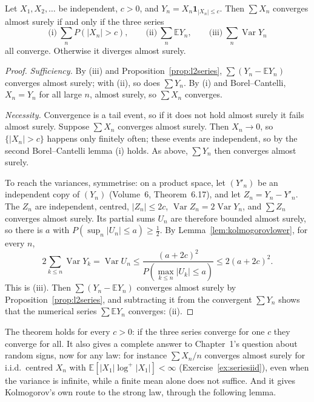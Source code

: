 \begin{theorem}\label{thm:threeseries}
Let $X_1,X_2,\dots$ be independent, $c>0$, and $Y_n=X_n\mathbf 1_{|X_n|\le c}$. Then $\sum X_n$ converges almost surely if and only if the three
series
\[
\text{(i)}\ \sum_nP(|X_n|>c),\qquad\text{(ii)}\ \sum_n\mathbb E Y_n,\qquad\text{(iii)}\ \sum_n\operatorname{Var}Y_n
\]
all converge. Otherwise it diverges almost surely.
\end{theorem}
\begin{proof}
\emph{Sufficiency.} By (iii) and Proposition~\ref{prop:l2series}, $\sum(Y_n-\mathbb E Y_n)$ converges almost surely; with (ii), so does $\sum Y_n$.
By (i) and Borel--Cantelli, $X_n=Y_n$ for all large $n$, almost surely, so $\sum X_n$ converges.

\emph{Necessity.} Convergence is a tail event, so if it does not hold almost surely it fails almost surely. Suppose $\sum X_n$ converges almost surely.
Then $X_n\to0$, so $\{|X_n|>c\}$ happens only finitely often; these events are independent, so by the second Borel--Cantelli lemma (i) holds. As above,
$\sum Y_n$ then converges almost surely.

To reach the variances, symmetrise: on a product space, let $(Y'_n)$ be an independent copy of $(Y_n)$ (Volume~6, Theorem~6.17), and let
$Z_n=Y_n-Y'_n$. The $Z_n$ are independent, centred, $|Z_n|\le2c$, $\operatorname{Var}Z_n=2\operatorname{Var}Y_n$, and $\sum Z_n$ converges almost
surely. Its partial sums $U_n$ are therefore bounded almost surely, so there is $a$ with $P(\sup_n|U_n|\le a)\ge\frac12$. By
Lemma~\ref{lem:kolmogorovlower}, for every $n$,
\[
2\sum_{k\le n}\operatorname{Var}Y_k=\operatorname{Var}U_n\le\frac{(a+2c)^2}{P(\max_{k\le n}|U_k|\le a)}\le2(a+2c)^2.
\]
This is (iii). Then $\sum(Y_n-\mathbb E Y_n)$ converges almost surely by Proposition~\ref{prop:l2series}, and subtracting it from the convergent
$\sum Y_n$ shows that the numerical series $\sum\mathbb E Y_n$ converges: (ii).
\end{proof}

The theorem holds for every $c>0$: if the three series converge for one $c$ they converge for all. It also gives a complete answer to Chapter~1's
question about random signs, now for any law: for instance $\sum X_n/n$ converges almost surely for i.i.d.\ centred $X_n$ with $\mathbb E[|X_1|\log^+|X_1|]<\infty$
(Exercise~\ref{ex:seriesiid}), even when the variance is infinite, while a finite mean alone does not suffice. And it gives Kolmogorov's own route to the strong law, through the following lemma.

